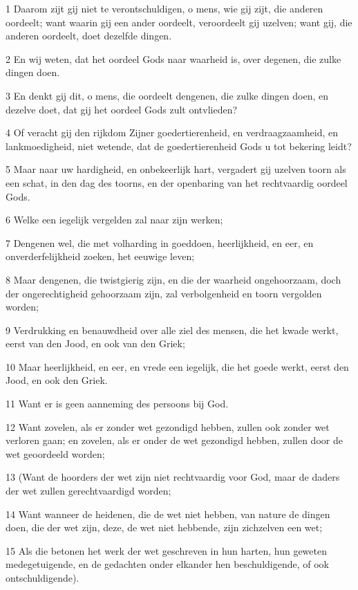 \par 1 Daarom zijt gij niet te verontschuldigen, o mens, wie gij zijt, die anderen oordeelt; want waarin gij een ander oordeelt, veroordeelt gij uzelven; want gij, die anderen oordeelt, doet dezelfde dingen.
\par 2 En wij weten, dat het oordeel Gods naar waarheid is, over degenen, die zulke dingen doen.
\par 3 En denkt gij dit, o mens, die oordeelt dengenen, die zulke dingen doen, en dezelve doet, dat gij het oordeel Gods zult ontvlieden?
\par 4 Of veracht gij den rijkdom Zijner goedertierenheid, en verdraagzaamheid, en lankmoedigheid, niet wetende, dat de goedertierenheid Gods u tot bekering leidt?
\par 5 Maar naar uw hardigheid, en onbekeerlijk hart, vergadert gij uzelven toorn als een schat, in den dag des toorns, en der openbaring van het rechtvaardig oordeel Gods.
\par 6 Welke een iegelijk vergelden zal naar zijn werken;
\par 7 Dengenen wel, die met volharding in goeddoen, heerlijkheid, en eer, en onverderfelijkheid zoeken, het eeuwige leven;
\par 8 Maar dengenen, die twistgierig zijn, en die der waarheid ongehoorzaam, doch der ongerechtigheid gehoorzaam zijn, zal verbolgenheid en toorn vergolden worden;
\par 9 Verdrukking en benauwdheid over alle ziel des mensen, die het kwade werkt, eerst van den Jood, en ook van den Griek;
\par 10 Maar heerlijkheid, en eer, en vrede een iegelijk, die het goede werkt, eerst den Jood, en ook den Griek.
\par 11 Want er is geen aanneming des persoons bij God.
\par 12 Want zovelen, als er zonder wet gezondigd hebben, zullen ook zonder wet verloren gaan; en zovelen, als er onder de wet gezondigd hebben, zullen door de wet geoordeeld worden;
\par 13 (Want de hoorders der wet zijn niet rechtvaardig voor God, maar de daders der wet zullen gerechtvaardigd worden;
\par 14 Want wanneer de heidenen, die de wet niet hebben, van nature de dingen doen, die der wet zijn, deze, de wet niet hebbende, zijn zichzelven een wet;
\par 15 Als die betonen het werk der wet geschreven in hun harten, hun geweten medegetuigende, en de gedachten onder elkander hen beschuldigende, of ook ontschuldigende).
